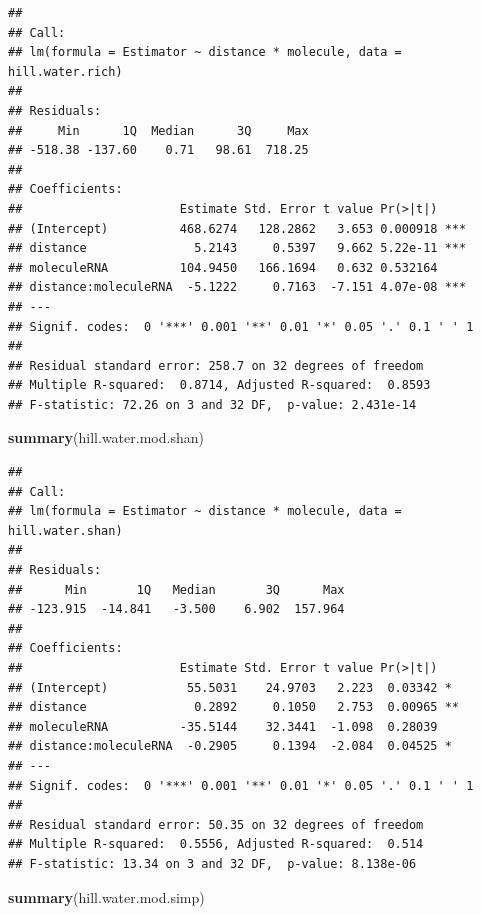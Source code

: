\documentclass[]{article}
\newenvironment{Shaded}{\begin{snugshade}}{\end{snugshade}}
\newcommand{\KeywordTok}[1]{\textcolor[rgb]{0.13,0.29,0.53}{\textbf{#1}}}
\newcommand{\NormalTok}[1]{#1}
\begin{document}
\begin{verbatim}
## 
## Call:
## lm(formula = Estimator ~ distance * molecule, data = hill.water.rich)
## 
## Residuals:
##     Min      1Q  Median      3Q     Max 
## -518.38 -137.60    0.71   98.61  718.25 
## 
## Coefficients:
##                      Estimate Std. Error t value Pr(>|t|)    
## (Intercept)          468.6274   128.2862   3.653 0.000918 ***
## distance               5.2143     0.5397   9.662 5.22e-11 ***
## moleculeRNA          104.9450   166.1694   0.632 0.532164    
## distance:moleculeRNA  -5.1222     0.7163  -7.151 4.07e-08 ***
## ---
## Signif. codes:  0 '***' 0.001 '**' 0.01 '*' 0.05 '.' 0.1 ' ' 1
## 
## Residual standard error: 258.7 on 32 degrees of freedom
## Multiple R-squared:  0.8714, Adjusted R-squared:  0.8593 
## F-statistic: 72.26 on 3 and 32 DF,  p-value: 2.431e-14
\end{verbatim}

\begin{Shaded}
\begin{Highlighting}[]
\KeywordTok{summary}\NormalTok{(hill.water.mod.shan)}
\end{Highlighting}
\end{Shaded}

\begin{verbatim}
## 
## Call:
## lm(formula = Estimator ~ distance * molecule, data = hill.water.shan)
## 
## Residuals:
##      Min       1Q   Median       3Q      Max 
## -123.915  -14.841   -3.500    6.902  157.964 
## 
## Coefficients:
##                      Estimate Std. Error t value Pr(>|t|)   
## (Intercept)           55.5031    24.9703   2.223  0.03342 * 
## distance               0.2892     0.1050   2.753  0.00965 **
## moleculeRNA          -35.5144    32.3441  -1.098  0.28039   
## distance:moleculeRNA  -0.2905     0.1394  -2.084  0.04525 * 
## ---
## Signif. codes:  0 '***' 0.001 '**' 0.01 '*' 0.05 '.' 0.1 ' ' 1
## 
## Residual standard error: 50.35 on 32 degrees of freedom
## Multiple R-squared:  0.5556, Adjusted R-squared:  0.514 
## F-statistic: 13.34 on 3 and 32 DF,  p-value: 8.138e-06
\end{verbatim}

\begin{Shaded}
\begin{Highlighting}[]
\KeywordTok{summary}\NormalTok{(hill.water.mod.simp)}
\end{Highlighting}
\end{Shaded}
\end{document}
